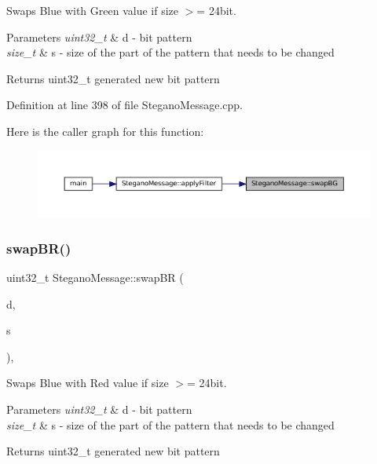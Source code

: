 Swaps Blue with Green value if size $>$= 24bit. 


\begin{DoxyParams}{Parameters}
{\em uint32\+\_\+t} & d -\/ bit pattern \\
\hline
{\em size\+\_\+t} & s -\/ size of the part of the pattern that needs to be changed \\
\hline
\end{DoxyParams}
\begin{DoxyReturn}{Returns}
uint32\+\_\+t generated new bit pattern 
\end{DoxyReturn}


Definition at line 398 of file Stegano\+Message.\+cpp.

Here is the caller graph for this function\+:\nopagebreak
\begin{figure}[H]
\begin{center}
\leavevmode
\includegraphics[width=350pt]{classSteganoMessage_a06f64f5198cf180771dfe692125936be_icgraph}
\end{center}
\end{figure}
\mbox{\label{classSteganoMessage_a530e5ee67cf45ac56f8f3be4d2b44d2e}} 
\subsubsection{\texorpdfstring{swapBR()}{swapBR()}}
{\footnotesize\ttfamily uint32\+\_\+t Stegano\+Message\+::swap\+BR (\begin{DoxyParamCaption}\item[{uint32\+\_\+t}]{d,  }\item[{size\+\_\+t}]{s }\end{DoxyParamCaption})\hspace{0.3cm}{\ttfamily [static]}, {\ttfamily [private]}}



Swaps Blue with Red value if size $>$= 24bit. 


\begin{DoxyParams}{Parameters}
{\em uint32\+\_\+t} & d -\/ bit pattern \\
\hline
{\em size\+\_\+t} & s -\/ size of the part of the pattern that needs to be changed \\
\hline
\end{DoxyParams}
\begin{DoxyReturn}{Returns}
uint32\+\_\+t generated new bit pattern 
\end{DoxyReturn}


